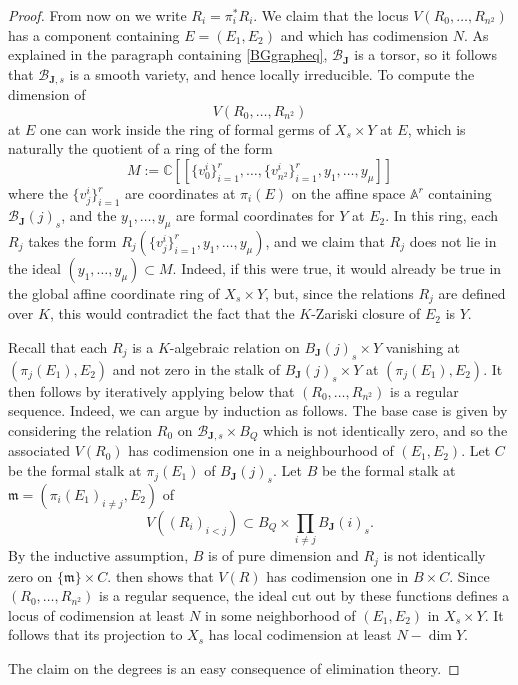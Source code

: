 \documentclass[10pt]{article}
\numberwithin{equation}{section}
\theoremstyle{plain}
\theoremstyle{definition}
\theoremstyle{remark}
\begin{document}
\begin{proof}
From now on we write $R_{i} = \pi^{*}_{i} R_{i}$. We claim that the locus $V(R_{0}, \hdots, R_{n^2})$ has a component containing $E = (E_{1}, E_{2})$ and which has codimension $N$. As explained in the paragraph containing \eqref{BGgrapheq}, $\mathcal{B}_{\mathbf{J}}$ is a torsor, so it follows that $\mathcal{B}_{\mathbf{J},s}$ is a smooth variety, and hence locally irreducible. To compute the dimension of $$V(R_{0}, \hdots, R_{n^2})$$ at $E$ one can work inside the ring of formal germs of $X_{s} \times Y$ at $E$, which is naturally the quotient of a ring of the form
\begin{displaymath}
  M:=   \mathbb{C}[[\{ v^{i}_{0} \}^{r}_{i=1}, \hdots, \{ v^{i}_{n^2} \}^{r}_{i=1}, y_{1}, \hdots, y_{\mu} ]]
\end{displaymath}
where the $\{ v^{i}_{j} \}^{r}_{i=1}$ are coordinates at $\pi_{i}(E)$ on the affine space $\mathbb{A}^{r}$ containing $\mathcal{B}_{\mathbf{J}}(j)_{s}$, and the $y_{1}, \hdots, y_{\mu}$ are formal coordinates for $Y$ at $E_{2}$. In this ring, each $R_{j}$ takes the form $R_{j}(\{ v^{i}_{j} \}^{r}_{i=1}, y_{1}, \hdots, y_{\mu})$, and we claim that $R_j$ does not lie in the ideal $(y_1,\dots, y_\mu) \subset M$. Indeed, if this were true, it would already be true in the global affine coordinate ring of $X_s\times Y$, but, since the relations $R_j$ are defined over $K$, this would contradict the fact that the $K$-Zariski closure of $E_{2}$ is $Y$.



Recall that each $R_j$ is a $K$-algebraic relation on $B_{\mathbf{J}}(j)_{s} \times Y$ vanishing at $(\pi_j(E_1),E_2)$ and not zero in the stalk of $B_{\mathbf{J}}(j)_{s} \times Y$ at $(\pi_{j}(E_{1}), E_{2})$.  It then follows by iteratively applying  below that $(R_{0}, \hdots, R_{n^2})$ is a regular sequence. Indeed, we can argue by induction as follows. The base case is given by considering the relation $R_0$ on $\mathcal{B}_{\mathbf{J}, {s}}\times B_Q$ which is not identically zero, and so the associated $V(R_0)$ has codimension one in a neighbourhood of $(E_1, E_2)$. Let $C$ be the formal stalk at $\pi_j(E_1)$ of $B_{\mathbf{J}}(j)_{s}$. Let $B$ be the formal stalk at $\mathfrak{m}=(\pi_i(E_1)_{i\neq j},E_2)$ of 
\begin{displaymath}
V ((R_i)_{i< j} ) \subset  B_Q \times \prod_{i\neq j} B_{\mathbf{J}}(i)_{s} .
\end{displaymath}
 By the inductive assumption, $B$ is of pure dimension and  $R_j$ is not identically zero on $\{ \mathfrak{m} \} \times C$.  then shows that $V(R)$ has codimension one in $B\times C$. Since $(R_{0}, \hdots, R_{n^2})$ is a regular sequence, the ideal cut out by these functions defines a locus of codimension at least $N$ in some neighborhood of $(E_1,E_2)$ in $X_s\times Y$. It follows that its projection to $X_{s}$ has local codimension at least $N - \dim Y$. 

The claim on the degrees is an easy consequence of elimination theory.
\end{proof}
\end{document}
